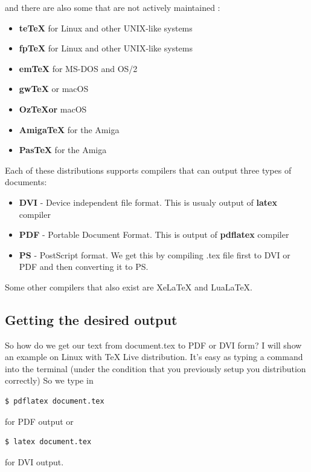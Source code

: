 \documentclass[a4paper,oneside,8pt]{extarticle}
\newcommand{\tex}{\TeX\xspace}
\begin{document}
and there are also some that are not actively maintained \cite{Old_Distributions}:
\begin{itemize}
    \item \textbf{teTeX} for Linux and other UNIX-like systems
    \item \textbf{fpTeX} for Linux and other UNIX-like systems 
    \item \textbf{emTeX} for MS-DOS and OS/2
    \item \textbf{gwTeX} or macOS 
    \item \textbf{OzTeXor} macOS
    \item \textbf{AmigaTeX} for the Amiga
    \item \textbf{PasTeX} for the Amiga
\end{itemize}

Each of these distributions supports compilers that can output three types of documents:
\begin{itemize}
	\item \textbf{DVI} - Device independent file format. This is usualy output of \textbf{latex} compiler 
	\item \textbf{PDF} - Portable Document Format. This is output of \textbf{pdflatex} compiler
	\item \textbf{PS} - PostScript format. We get this by compiling .tex file  first to DVI or PDF and then converting it to PS. 
\end{itemize}

Some other compilers that also exist are XeLaTeX and LuaLaTeX.

\subsection{Getting the desired output}

So how do we get our text from document.tex to PDF or DVI form? I will show an example on Linux with \tex Live distribution.
It's easy as typing a command into the terminal (under the condition that you previously setup you distribution correctly)
So we type in 
\begin{lstlisting}[language=bash]
    $ pdflatex document.tex
\end{lstlisting}

for PDF output or

\begin{lstlisting}[language=bash]
    $ latex document.tex
\end{lstlisting}

for DVI output.\\
\end{document}
